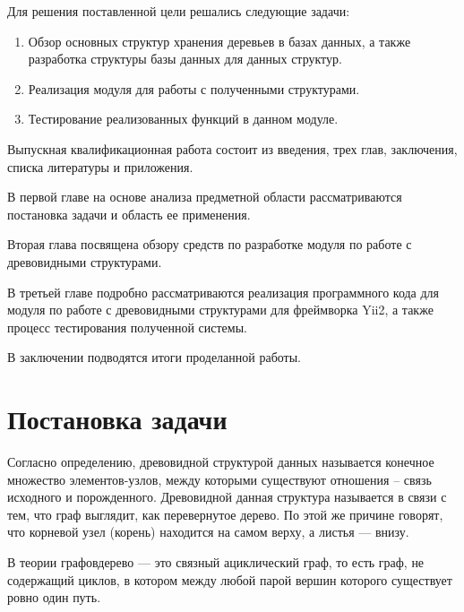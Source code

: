 \documentclass[a4paper,14pt]{extreport}
\theoremstyle{definition}
\begin{document}
Для решения поставленной цели решались следующие задачи:
\begin{enumerate}
\item Обзор основных структур хранения деревьев в базах данных, а также разработка структуры базы данных для данных структур.
\item Реализация модуля для работы с полученными структурами.
\item Тестирование реализованных функций в данном модуле.
\end{enumerate}

Выпускная квалификационная работа состоит из введения, трех глав, заключения, списка литературы и приложения.

В первой главе на основе анализа предметной области рассматриваются постановка задачи и область ее применения.

Вторая глава посвящена обзору средств по разработке модуля по работе с древовидными структурами.

В третьей главе подробно рассматриваются реализация программного кода для модуля по работе с древовидными структурами для фреймворка Yii2, а также процесс тестирования полученной системы.

В заключении подводятся итоги проделанной работы.
\chapter{Постановка задачи}
Согласно определению\cite{Tsvetkova}, древовидной структурой данных называется конечное множество элементов-узлов, между которыми существуют отношения – связь исходного и порожденного. Древовидной данная структура называется в связи с тем, что граф выглядит, как перевернутое дерево. По этой же причине говорят, что корневой узел (корень) находится на самом верху, а листья — внизу.

В теории графов\cite{Haggard,Haggarty}дерево — это связный ациклический граф, то есть граф, не содержащий циклов, в котором между любой парой вершин которого существует ровно один путь.
\end{document}
